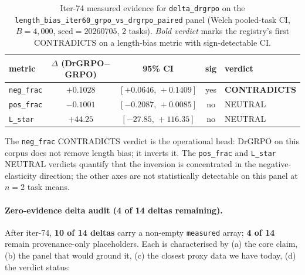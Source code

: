 \begin{table}[h]
\centering\small
\caption{Iter-74 measured evidence for \texttt{delta\_drgrpo} on the
\texttt{length\_bias\_iter60\_grpo\_vs\_drgrpo\_paired} panel
(Welch pooled-task CI, $B=4{,}000$, $\text{seed}=20260705$, 2 tasks).
\emph{Bold verdict} marks the registry's first CONTRADICTS on a
length-bias metric with sign-detectable CI.}
\label{tab:p6-drgrpo-measured}
\begin{tabular}{l c c c l}
\toprule
metric & $\Delta$ (DrGRPO$-$GRPO) & 95\% CI & sig & verdict \\
\midrule
\texttt{neg\_frac}  & $+0.1028$ & $[+0.0646,\,+0.1409]$ & yes & \textbf{CONTRADICTS} \\
\texttt{pos\_frac}  & $-0.1001$ & $[-0.2087,\,+0.0085]$ & no  & NEUTRAL \\
\texttt{L\_star}    & $+44.25$  & $[-27.85,\,+116.35]$  & no  & NEUTRAL \\
\bottomrule
\end{tabular}
\end{table}

The \texttt{neg\_frac} CONTRADICTS verdict is the operational head:
DrGRPO on this corpus does not remove length bias; it inverts it.
The \texttt{pos\_frac} and \texttt{L\_star} NEUTRAL verdicts
quantify that the inversion is concentrated in the
negative-elasticity direction; the other axes are not statistically
detectable on this panel at $n{=}2$ task means.

\paragraph{Zero-evidence delta audit (4 of 14 deltas remaining).}
After iter-74, \textbf{10 of 14 deltas} carry a non-empty
\texttt{measured} array; \textbf{4 of 14} remain provenance-only
placeholders. Each is characterised by (a) the core claim, (b) the
panel that would ground it, (c) the closest proxy data we have today,
(d) the verdict status:

